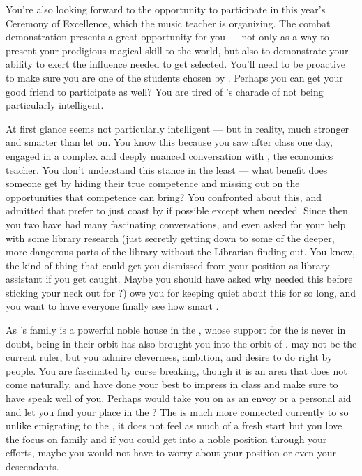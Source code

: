 \documentclass[char]{GL2020}
\begin{document}
You're also looking forward to the opportunity to participate in this year's Ceremony of Excellence, which the music teacher \cMusic{\full} is organizing. The combat demonstration presents a great opportunity for you — not only as a way to present your prodigious magical skill to the world, but also to demonstrate your ability to exert the influence needed to get selected. You'll need to be proactive to make sure you are one of the students chosen by \cMusic{}. Perhaps you can get your good friend \cChupStudent{\full} to participate as well? You are tired of \cChupStudent{}’s charade of not being particularly intelligent.

At first glance \cChupStudent{} seems not particularly intelligent — but in reality, \cChupStudent{\theyare} much stronger and smarter than \cChupStudent{\they} let\cChupStudent{\verbs} on. You know this because you saw \cChupStudent{} after class one day, engaged in a complex and deeply nuanced conversation with \cChupSecond{}, the economics teacher. You don't understand this stance in the least — what benefit does someone get by hiding their true competence and missing out on the opportunities that competence can bring? You confronted \cChupStudent{\them} about this, and \cChupStudent{\they} admitted that \cChupStudent{\they} prefer\cChupStudent{\verbs} to just coast by if possible except when needed. Since then you two have had many fascinating conversations, and \cChupStudent{\theyhave} even asked for your help with some library research (just secretly getting down to some of the deeper, more dangerous parts of the library without the Librarian finding out. You know, the kind of thing that could get you dismissed from your position as library assistant if you get caught. Maybe you should have asked why \cChupStudent{} needed this before sticking your neck out for \cChupStudent{\them}?) \cChupStudent{\They} owe\cChupStudent{\verbs} you for keeping quiet about this for so long, and you want to have everyone finally see how smart \cChupStudent{\theyare}.

As \cChupStudent{}’s family is a powerful noble house in the \pFarm{}, whose support for the \cQueen{} is never in doubt, being in their orbit has also brought you into the orbit of \cPrince{\full}. \cPrince{\They} may not be the current ruler, but you admire \cPrince{\their} cleverness, \cPrince{\their} ambition, and \cPrince{\their} desire to do right by \cPrince{\their} people. You are fascinated by curse breaking, though it is an area that does not come naturally, and have done your best to impress \cPrince{\them} in class and make sure to have \cChupStudent{} speak well of you. Perhaps \cPrince{\they} would take you on as an envoy or a personal aid and let you find your place in the \pFarm{}? The \pFarm{} is much more connected currently to \pTech{} so unlike emigrating to the \pShip{}, it does not feel as much of a fresh start but you love the focus on family and if you could get into a noble position through your efforts, maybe you would not have to worry about your position or even your descendants. 
\end{document}
